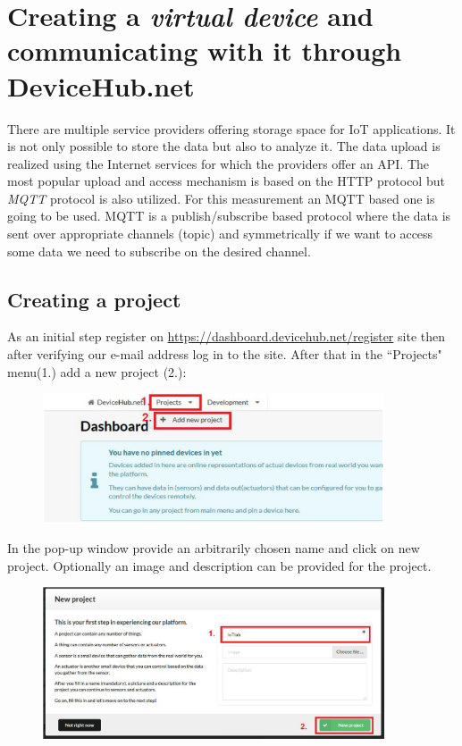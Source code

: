 \documentclass[a4paper]{article}
\begin{document}
\section{Creating a \emph{virtual device} and communicating with it through DeviceHub.net}

There are multiple service providers offering storage space for IoT applications. It is not only possible to store the
data but also to analyze it. The data upload is realized using the Internet services for which the providers offer an
API. The most popular upload and access mechanism is based on the HTTP protocol but \emph{MQTT} protocol is also
utilized. For this measurement an MQTT based one is going to be used. MQTT is a publish/subscribe based protocol where
the data is sent over appropriate channels (topic) and symmetrically if we want to access some data we need to
subscribe on the desired channel.

\subsection{Creating a project}

As an initial step register on \url{https://dashboard.devicehub.net/register} site then after verifying our e-mail
address log in to the site.
After that in the ``Projects" menu(1.) add a new project (2.):

\begin{figure}[H]
    \centering
    \includegraphics[width=0.9\textwidth]{figures/devicehub-addproject.png}
\end{figure}

In the pop-up window provide an arbitrarily chosen name and click on new project. Optionally an image and description
can be provided for the project.

\begin{figure}[H]
    \centering
    \includegraphics[width=0.9\textwidth]{figures/devicehub-newproject.png}
\end{figure}
\end{document}
